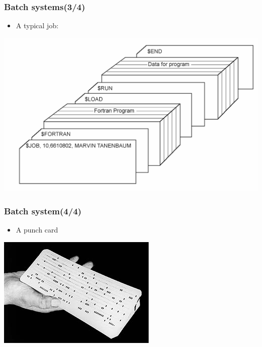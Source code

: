 \documentclass[CJKutf8,xcolor=pdftex,dvipsnames,table]{beamer}
\begin{document}
\begin{CJK*}{UTF8}{song}
  \begin{frame}
    \frametitle{Batch systems(3/4)} \pause
	  \begin{itemize}
	  \item{A typical job: } \pause
	  \end{itemize}
	  \begin{center}
	    \includegraphics[scale=0.5]{mosv2f1-3}
	  \end{center}
  \end{frame}

  \begin{frame}
    \frametitle{Batch system(4/4)} \pause
	  \begin{itemize}
	  \item{A punch card} \pause
	  \end{itemize}
	  \begin{center}
	    \includegraphics[scale=0.5]{punchcard}
	  \end{center}
  \end{frame}


\end{CJK*}
\end{document}
